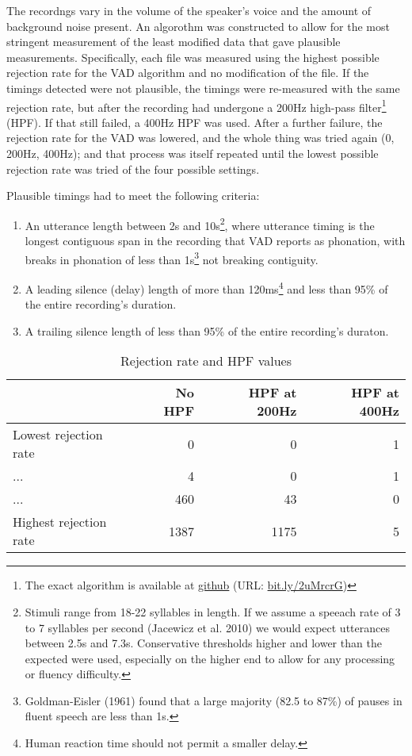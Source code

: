 \documentclass[]{tufte-handout}
\begin{document}
The recordngs vary in the volume of the speaker's voice and the amount
of background noise present. An algorothm was constructed to allow for
the most stringent measurement of the least modified data that gave
plausible measurements. Specifically, each file was measured using the
highest possible rejection rate for the VAD algorithm and no
modification of the file. If the timings detected were not plausible,
the timings were re-measured with the same rejection rate, but after the
recording had undergone a 200Hz high-pass filter\footnote{The exact
  algorithm is available at
  \href{https://gist.github.com/moui72/4ebc4eb8f69eb9fdb1cab160ce299675}{github}
  (URL: \href{https://bit.ly/2uMrcrG}{bit.ly/2uMrcrG})} (HPF). If that
still failed, a 400Hz HPF was used. After a further failure, the
rejection rate for the VAD was lowered, and the whole thing was tried
again (0, 200Hz, 400Hz); and that process was itself repeated until the
lowest possible rejection rate was tried of the four possible settings.

Plausible timings had to meet the following criteria:

\begin{enumerate}
\def\labelenumi{\arabic{enumi}.}
\item
  An utterance length between 2s and 10s\footnote{Stimuli range from
    18-22 syllables in length. If we assume a speeach rate of 3 to 7
    syllables per second (Jacewicz et al. 2010) we would expect
    utterances between 2.5s and 7.3s. Conservative thresholds higher and
    lower than the expected were used, especially on the higher end to
    allow for any processing or fluency difficulty.}, where utterance
  timing is the longest contiguous span in the recording that VAD
  reports as phonation, with breaks in phonation of less than
  1s\footnote{Goldman-Eisler (1961) found that a large majority (82.5 to
    87\%) of pauses in fluent speech are less than 1s.} not breaking
  contiguity.
\item
  A leading silence (delay) length of more than 120ms\footnote{Human
    reaction time should not permit a smaller delay.} and less than 95\%
  of the entire recording's duration.
\item
  A trailing silence length of less than 95\% of the entire recording's
  duraton.
\end{enumerate}

\begin{table}[t]

\caption{\label{tab:metable}Rejection rate and HPF values}
\centering
\begin{tabular}{lrrr}
\toprule
  & No HPF & HPF at 200Hz & HPF at 400Hz\\
\midrule
Lowest rejection rate & 0 & 0 & 1\\
... & 4 & 0 & 1\\
... & 460 & 43 & 0\\
Highest rejection rate & 1387 & 1175 & 5\\
\bottomrule
\end{tabular}
\end{table}
\end{document}
